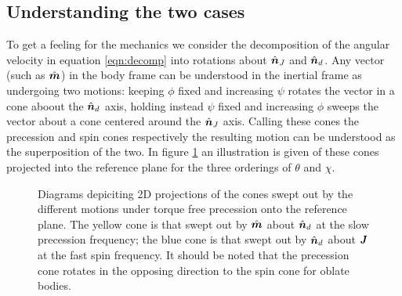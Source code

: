 \documentclass[11pt]{article}
\numberwithin{equation}{section}
\numberwithin{figure}{section}
\numberwithin{table}{section}
\begin{document}
\subsection{Understanding the two cases}
To get a feeling for the mechanics we consider the decomposition of the angular velocity in equation \ref{eqn:decomp} into rotations about $\hat{\boldsymbol{n}}_{J}$ and $\hat{\boldsymbol{n}}_{d}$. Any vector (such as $\hat{\boldsymbol{m}}$) in the body frame can be understood in the inertial frame as undergoing two motions: keeping $\phi$ fixed and increasing $\psi$ rotates the vector in a cone aboout the $\hat{\boldsymbol{n}}_{d}$ axis, holding instead $\psi$ fixed and increasing $\phi$ sweeps the vector about a cone centered around the $\hat{\boldsymbol{n}}_{J}$ axis.  Calling these cones the precession and spin cones respectively the resulting motion can be understood as the superposition of the two.  In figure \ref{fig:cones} an illustration is given of these cones projected into the reference plane for the three orderings of $\theta$ and $\chi$.  
\begin{figure}[ht]
\centering
\caption{Diagrams depiciting 2D projections of the cones swept out by the different motions under torque free precession onto the reference plane. The yellow cone is that swept out by $\hat{\boldsymbol{m}}$ about $\hat{\boldsymbol{n}}_{d}$ at the slow precession frequency; the blue cone is that swept out by $\hat{\boldsymbol{n}}_{d}$ about $\boldsymbol{J}$ at the fast spin frequency. It should be noted that the precession cone rotates in the opposing direction to the spin cone for oblate bodies. }
\label{fig:cones}
\end{figure}
\end{document}

